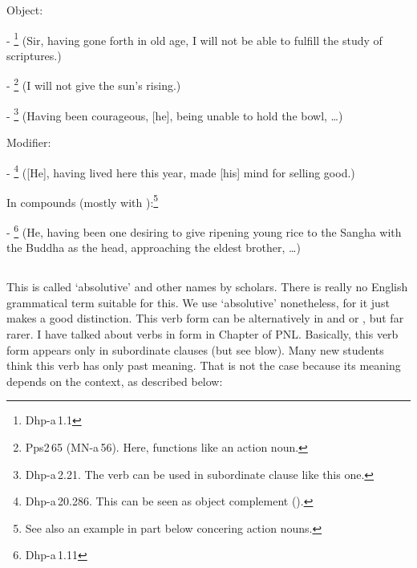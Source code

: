 \begin{compactenum}[(1)]
\item Object:\par
- \footnote{Dhp-a\,1.1} (Sir, having gone forth in old age, I will not be able to fulfill the study of scriptures.)\par
- \footnote{Pps2\,65 (MN-a\,56). Here,  functions like an action noun.} (I will not give the sun's rising.)\par
- \footnote{Dhp-a\,2.21. The verb can be used in subordinate clause like this one.} (Having been courageous, [he], being unable to hold the bowl, \ldots)\par

\item Modifier:\par
- \footnote{Dhp-a\,20.286. This can be seen as object complement ().} ([He], having lived here this year, made [his] mind for selling good.)\par

\item In compounds (mostly with ):\footnote{See also an example in  part below concering action nouns.}\par
- \footnote{Dhp-a\,1.11} (He, having been one desiring to give ripening young rice to the Sangha with the Buddha as the head, approaching the eldest brother, \ldots)\par
\end{compactenum}

{}
\subsection*{}

This is called `absolutive' and other names by scholars. There is really no English grammatical term suitable for this. We use `absolutive' nonetheless, for it just makes a good distinction. This verb form can be alternatively in  and  or , but far rarer. I have talked about verbs in  form in Chapter  of PNL. Basically, this verb form appears only in subordinate clauses (but see blow). Many new students think this verb has only past meaning. That is not the case because its meaning depends on the context, as described below:

